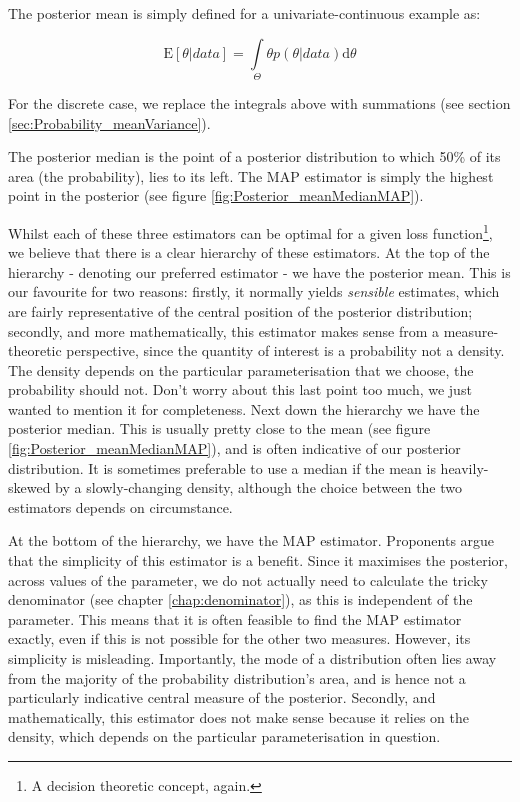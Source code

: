 \documentclass[11pt,fullpage]{book}
\begin{document}
The posterior mean is simply defined for a univariate-continuous example as:

\begin{equation}
\mathrm{E}[\theta|data] = \int\limits_{\Theta} \theta p(\theta|data)\mathrm{d}\theta
\end{equation}

For the discrete case, we replace the integrals above with summations (see section \ref{sec:Probability_meanVariance}). 

The posterior median is the point of a posterior distribution to which 50\% of its area (the probability), lies to its left. The MAP estimator is simply the highest point in the posterior (see figure \ref{fig:Posterior_meanMedianMAP}).

Whilst each of these three estimators can be optimal for a given loss function\footnote{A decision theoretic concept, again.}, we believe that there is a clear hierarchy of these estimators. At the top of the hierarchy - denoting our preferred estimator - we have the posterior mean. This is our favourite for two reasons: firstly, it normally yields \textit{sensible} estimates, which are fairly representative of the central position of the posterior distribution; secondly, and more mathematically, this estimator makes sense from a measure-theoretic perspective, since the quantity of interest is a probability not a density. The density depends on the particular parameterisation that we choose, the probability should not. Don't worry about this last point too much, we just wanted to mention it for completeness. Next down the hierarchy we have the posterior median. This is usually pretty close to the mean (see figure \ref{fig:Posterior_meanMedianMAP}), and is often indicative of our posterior distribution. It is sometimes preferable to use a median if the mean is heavily-skewed by a slowly-changing density, although the choice between the two estimators depends on circumstance.

At the bottom of the hierarchy, we have the MAP estimator. Proponents argue that the simplicity of this estimator is a benefit. Since it maximises the posterior, across values of the parameter, we do not actually need to calculate the tricky denominator (see chapter \ref{chap:denominator}), as this is independent of the parameter. This means that it is often feasible to find the MAP estimator exactly, even if this is not possible for the other two measures. However, its simplicity is misleading. Importantly, the mode of a distribution often lies away from the majority of the probability distribution's area, and is hence not a particularly indicative central measure of the posterior. Secondly, and mathematically, this estimator does not make sense because it relies on the density, which depends on the particular parameterisation in question.
\end{document}
